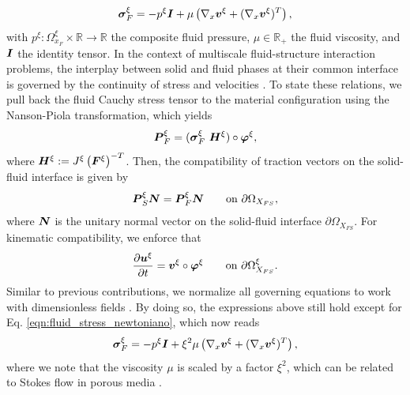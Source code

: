 \documentclass[preprint,3p,12pt,number,sort&compress]{elsarticle}
\newcommand{\pd}[2]{\frac{\partial #1}{ \partial #2}}   %
\def\vec   #1{\text{\boldmath $#1$}{}}
\def\ten   #1{\text{\boldmath $#1$}{}}
\def\R{\mbox{\(\mathbb{R}\)}}
\begin{document}
\begin{equation}
	\ten {\sigma}_F^{\xi} = -p_{}^{\xi} \ten I + \mu \left( \nabla_x \vec v^{\xi} + (\nabla_x \vec v^{\xi})^T \right), \label{eqn:fluid_stress_newtoniano}
\end{equation}
with $p^{\xi}: \Omega_{x_F}^{\xi} \times \R \to \R$ the composite fluid pressure, $\mu \in \R_{+}$  the fluid viscosity, and $\ten I$ the identity tensor. In the context of multiscale fluid-structure interaction problems, the interplay between solid and fluid phases at their common interface is governed by the continuity of stress and velocities \cite{CollisEtAl2017}. To state these relations, we pull back the fluid Cauchy stress tensor to the material configuration using the Nanson-Piola transformation, which yields
\begin{equation}
	\ten P_F^{\xi} = ( \ten \sigma_F^{\xi}  \ \ten H^{\xi} ) \circ \vec \varphi^{\xi}, \label{eqn:fluistrespullback}
\end{equation} 
where  $\ten H^{\xi} := J^{\xi} \left( \ten F^{\xi} \right)^{-T}$. Then,  the compatibility of traction vectors on the solid-fluid interface is given by
\begin{equation}
	\ten P_S^{\xi}  \vec N = \ten P_F^{\xi}  \vec N \qquad \mbox{on $\partial \Omega_{X_{FS}}$}, \label{eqn:compatibilty_stress}
\end{equation}
where $\vec N$ is the unitary normal vector on the solid-fluid interface  $\partial \Omega_{X_{FS}}$. For kinematic compatibility, we enforce that
\begin{equation}
	\pd{\vec u^{\xi} }{t} = \vec v^{\xi} \circ \vec{\varphi}^{\xi} \qquad \mbox{on $\partial \Omega^{\xi}_{X_{FS}}$}\label{eqn:compatibilty_vel}.
\end{equation}
Similar to previous contributions, we normalize all governing equations to work with dimensionless fields \cite{miller2021homogenized}. By doing so, the expressions above still hold except for Eq. \eqref{eqn:fluid_stress_newtoniano}, which now reads
\begin{equation}
	\ten {\sigma}^{\xi}_F = -p_{}^{\xi} \ten I + \xi ^2\mu \left( \nabla_x \vec v^{\xi} + (\nabla_x \vec v^{\xi})^T \right) \label{eqn:AdimensionalFluidStress},
\end{equation}
where we note that the viscosity $\mu$ is scaled by a factor $\xi^2$, which can be related to Stokes flow in porous media \cite{penta2014effective}.\\
\end{document}
